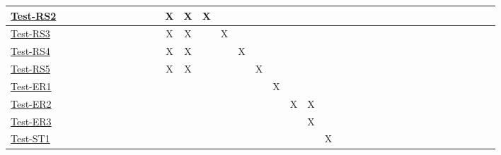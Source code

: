 \documentclass[12pt, titlepage]{article}
\begin{document}
\begin{landscape}
\begin{table}[H]
\begin{adjustwidth}{-0.1in}{-1in}
{\begin{tabular}{|c|c|c|c|c|c|c|c|c|c|c|c|c|c|c|c|c|l|l|l|l|l|l|l|l|l|l|l|l|l|l|l|l|l|l|l|l|}
\multicolumn{1}{|l|}{\hyperref[itm:Test-RS2]{Test-RS2}}   &             &             &             &             &             &             &              &             &              &              &             X&              X&             X&             &              &                & & & & & & & & &\\ \hline
\multicolumn{1}{|l|}{\hyperref[itm:Test-RS3]{Test-RS3}}   &             &             &             &              &             &              &             &             &              &              &              X&              X&              &              X&              &                & & & & & & & & &\\ \hline
\multicolumn{1}{|l|}{\hyperref[itm:Test-RS4]{Test-RS4}}   &             &             &             &             &             &              &             &             &              &              &             X&              X&              &             &              X&                & & & & & & & & &\\ \hline
\multicolumn{1}{|l|}{\hyperref[itm:Test-RS5]{Test-RS5}}   &             &             &             &              &             &              &              &             &              &              &             X&              X&              &             &              &                X& & & & & & & & &\\ \hline
\multicolumn{1}{|l|}{\hyperref[itm:Test-ER1]{Test-ER1}}   &             &             &             &              &             &              &              &             &              &              &             &              &              &             &              &                & X& & & & & & & &\\ \hline
\multicolumn{1}{|l|}{\hyperref[itm:Test-ER2]{Test-ER2}}   &             &             &             &              &             &             &             &             &              &              &              &              &              &              &              &               & & X& X& & & & & &\\ \hline
\multicolumn{1}{|l|}{\hyperref[itm:Test-ER3]{Test-ER3}}   &              &             &             &              &              &              &              &             &             &             &              &              &             &             &             &                & & & X& & & & & &\\ \hline
\multicolumn{1}{|l|}{\hyperref[itm:Test-ST1]{Test-ST1}}   &             &             &             &              &              &              &              &             &              &              &              &              &              &              &              &                & & & & X& & & & &\\ \hline

\end{tabular}}
\end{adjustwidth}
\end{table}
\end{landscape}
\end{document}
